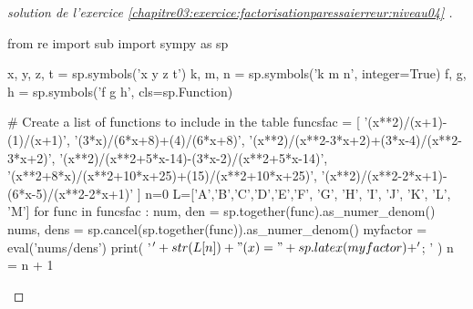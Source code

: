 \begin{proof}[solution de l'exercice \ref{chapitre03:exercice:factorisationparessaierreur:niveau04} ] \hfill 
 
\begin{pycode}
from re import sub
import sympy as sp

x, y, z, t = sp.symbols('x y z t')
k, m, n = sp.symbols('k m n', integer=True)
f, g, h = sp.symbols('f g h', cls=sp.Function)

# Create a list of functions to include in the table
funcsfac = [  
'(x**2)/(x+1)-(1)/(x+1)', 
'(3*x)/(6*x+8)+(4)/(6*x+8)', 
'(x**2)/(x**2-3*x+2)+(3*x-4)/(x**2-3*x+2)', 
'(x**2)/(x**2+5*x-14)-(3*x-2)/(x**2+5*x-14)', 
'(x**2+8*x)/(x**2+10*x+25)+(15)/(x**2+10*x+25)', 
'(x**2)/(x**2-2*x+1)-(6*x-5)/(x**2-2*x+1)'   
]
n=0
L=['A','B','C','D','E','F', 'G', 'H', 'I', 'J', 'K', 'L', 'M']
for func in funcsfac :  
	num, den = sp.together(func).as_numer_denom()
	nums, dens = sp.cancel(sp.together(func)).as_numer_denom()
	myfactor =  eval('nums/dens')
	print( '$'+ str(L[n])  + "(x)=" + sp.latex(myfactor) + '$; ' ) 
	n     = n + 1
\end{pycode} 
\end{proof}
%	 

